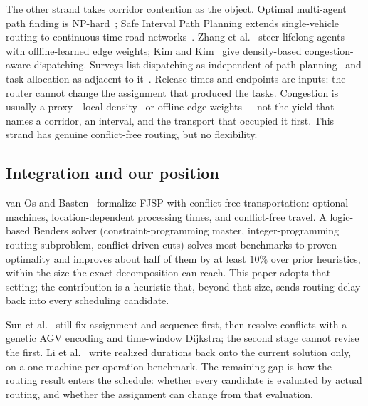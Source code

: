 The other strand takes corridor contention as the object.
Optimal multi-agent path finding is NP-hard~\cite{gao2023mapf}; Safe Interval Path Planning extends single-vehicle routing to continuous-time road networks~\cite{kasaura2022sipp}.
Zhang et al.~\cite{zhang2024guidance} steer lifelong agents with offline-learned edge weights; Kim and Kim~\cite{kim2026congestion} give density-based congestion-aware dispatching.
Surveys list dispatching as independent of path planning~\cite{lu2022agv} and task allocation as adjacent to it~\cite{fragapane2021planning}.
Release times and endpoints are inputs: the router cannot change the assignment that produced the tasks.
Congestion is usually a proxy---local density~\cite{kim2026congestion} or offline edge weights~\cite{zhang2024guidance}---not the yield that names a corridor, an interval, and the transport that occupied it first.
This strand has genuine conflict-free routing, but no flexibility.

\subsection{Integration and our position}

van Os and Basten~\cite{vanos2026exact} formalize FJSP with conflict-free transportation: optional machines, location-dependent processing times, and conflict-free travel.
A logic-based Benders solver (constraint-programming master, integer-programming routing subproblem, conflict-driven cuts) solves most benchmarks to proven optimality and improves about half of them by at least $10\%$ over prior heuristics, within the size the exact decomposition can reach.
This paper adopts that setting; the contribution is a heuristic that, beyond that size, sends routing delay back into every scheduling candidate.

Sun et al.~\cite{sun2023integrated} still fix assignment and sequence first, then resolve conflicts with a genetic AGV encoding and time-window Dijkstra; the second stage cannot revise the first.
Li et al.~\cite{li2026framework} write realized durations back onto the current solution only, on a one-machine-per-operation benchmark.
The remaining gap is how the routing result enters the schedule: whether every candidate is evaluated by actual routing, and whether the assignment can change from that evaluation.

